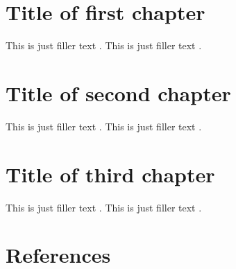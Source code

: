 \documentclass[a4paper,oneside]{book}
\begin{document}
\chapter{Title of first chapter}
\begin{refsection}
This is just filler text \parencite{westfahl:space}.
This is just filler text \parencite{nietzsche:ksa}.
\end{refsection}

\chapter{Title of second chapter}
\begin{refsection}
This is just filler text \parencite{nietzsche:historie}.
This is just filler text \parencite{westfahl:frontier}.
\end{refsection}

\chapter{Title of third chapter}
\begin{refsection}
This is just filler text \parencite{aristotle:anima}.
This is just filler text \parencite{averroes/bland}.
\end{refsection}

\chapter*{References}
\bibbysection
%
%
\end{document}
